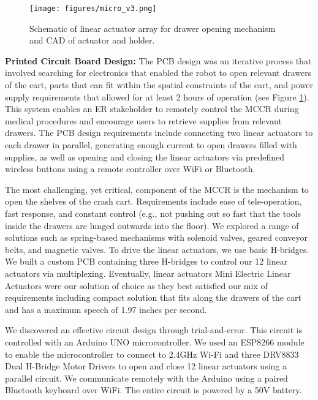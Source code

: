 \begin{figure}[t] 
	\centering 
	\texttt{[image: figures/micro\_v3.png]} 
	\caption{Schematic of linear actuator array for drawer opening mechanism and CAD of actuator and holder.}%
	\label{fig:pcb} 
\end{figure}


\textbf{Printed Circuit Board Design:} The PCB design was an iterative process that involved searching for electronics that enabled the robot to open relevant drawers of the cart, parts that can fit within the spatial constraints of the cart, and power supply requirements that allowed for at least 2 hours of operation (see Figure \ref{fig:pcb}).
This system enables an ER stakeholder to remotely control the MCCR during medical procedures and encourage users to retrieve supplies from relevant drawers. 
The PCB design requirements include connecting two linear actuators to each drawer in parallel, generating enough current to open drawers filled with supplies, as well as opening and closing the linear actuators via predefined wireless buttons using a remote controller over WiFi or Bluetooth.

The most challenging, yet critical, component of the MCCR is the mechanism to open the shelves of the crash cart. 
Requirements include ease of tele-operation, fast response, and constant control (e.g., not pushing out so fast that the tools inside the drawers are lunged outwards into the floor). 
We explored a range of solutions such as spring-based mechanisms with solenoid valves, geared conveyor belts, and magnetic valves. 
To drive the linear actuators, we use basic H-bridges. 
We built a custom PCB containing three H-bridges to control our 12 linear actuators via multiplexing. 
Eventually, linear actuators Mini Electric Linear Actuators were our solution of choice as they best satisfied our mix of requirements including compact solution that fits along the drawers of the cart and has a maximum speech of 1.97 inches per second.

We discovered an effective circuit design through trial-and-error. 
This circuit is controlled with an Arduino UNO microcontroller.
We used an ESP8266 module to enable the microcontroller to connect to 2.4GHz Wi-Fi and three DRV8833 Dual H-Bridge Motor Drivers to open and close 12 linear actuators using a parallel circuit.
We communicate remotely with the Arduino using a paired Bluetooth keyboard over WiFi.
The entire circuit is powered by a 50V battery. 

